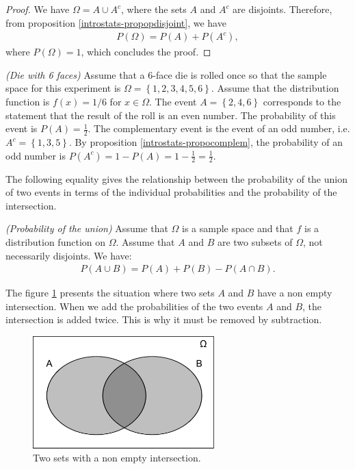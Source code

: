 \begin{proof}
We have $\Omega = A\cup A^c$, where the sets $A$ and $A^c$ are disjoints. Therefore, from 
proposition \ref{introstats-propopdisjoint}, we have 
\begin{eqnarray}
P(\Omega) = P(A) + P(A^c),
\end{eqnarray}
where $P(\Omega) = 1$, which concludes the proof.
\end{proof}

\begin{example}
\emph{(Die with 6 faces)}
\label{introstats-die6faces4}
Assume that a 6-face die is rolled once so that the sample space for this experiment is
$\Omega=\left\{1,2,3,4,5,6\right\}$.
Assume that the distribution function is $f(x)=1/6$ for $x\in\Omega$.
The event $A=\left\{2,4,6\right\}$ corresponds to the statement that the result of the roll is an even number.
The probability of this event is $P(A)= \frac{1}{2}$. 
The complementary event is the event of an odd number, i.e. $A^c = \left\{1,3,5\right\}$.
By proposition \ref{introstats-propocomplem}, the probability of an odd number is 
$P(A^c) = 1 - P(A) = 1 - \frac{1}{2} = \frac{1}{2}$.
\end{example}

The following equality gives the relationship between the probability
of the union of two events in terms of the individual probabilities and the 
probability of the intersection. 

\begin{proposition}
\emph{(Probability of the union)}
\label{introstats-propounion}
Assume that $\Omega$ is a sample space and that $f$ is a distribution
function on $\Omega$. Assume that $A$ and $B$ are two subsets of $\Omega$, not 
necessarily disjoints. We have:
\begin{eqnarray}
P(A\cup B) = P(A) + P(B) - P(A\cap B).
\end{eqnarray}
\end{proposition}

The figure \ref{fig-introstats-jointsets} presents the situation 
where two sets $A$ and $B$ have a non empty intersection.
When we add the probabilities of the two events $A$ and $B$, the 
intersection is added twice. This is why it must be removed by 
subtraction.

\begin{figure}
\begin{center}
\includegraphics[width=7cm]{introdiscreteprobas/sets-union.pdf}
\end{center}
\caption{Two sets with a non empty intersection.}
\label{fig-introstats-jointsets}
\end{figure}

